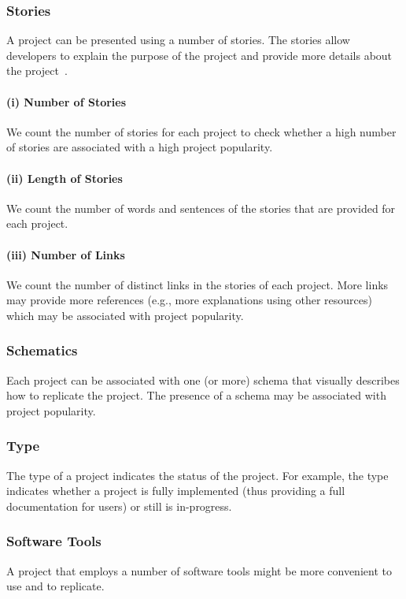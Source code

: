 \subsubsection*{Stories}

A project can be presented using a number of stories.
The stories allow developers to explain the purpose of the project and provide more details about the project~\cite{hackster}.

\paragraph*{(i) Number of Stories} We count the number of stories for each project to check whether a high number of stories are associated with a high project popularity.

\paragraph*{(ii) Length of Stories} We count the number of words and sentences of the stories that are provided for each project.

\paragraph*{(iii) Number of Links} We count the number of distinct links in the stories of each project. More links may provide more references (e.g., more explanations using other resources) which may be associated with project popularity.

\subsubsection*{Schematics} Each project can be associated with one (or more) schema that visually describes how to replicate the project.
The presence of a schema may be associated with project popularity. 

\subsubsection*{Type} The type of a project indicates the status of the project. For example, the type indicates whether a project is fully implemented (thus providing a full documentation for users) or still is in-progress.

\subsubsection*{Software Tools} A project that employs a number of software tools might be more convenient to use and to replicate.

